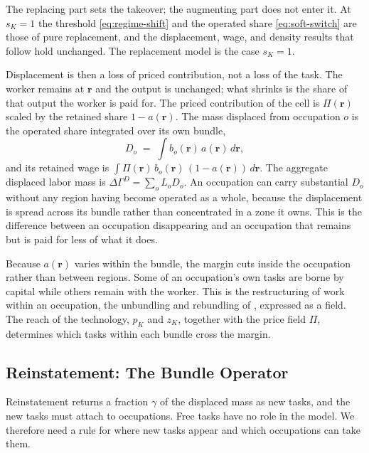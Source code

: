 \documentclass[12pt, a4paper]{article}
\begin{document}
The replacing part sets the takeover; the augmenting part does not enter
it. At $s_K = 1$ the threshold \eqref{eq:regime-shift} and the operated
share \eqref{eq:soft-switch} are those of pure replacement, and the
displacement, wage, and density results that follow hold unchanged. The
replacement model is the case $s_K = 1$.

Displacement is then a loss of priced contribution, not a loss of the
task. The worker remains at $\mathbf{r}$ and the output is unchanged;
what shrinks is the share of that output the worker is paid for. The
priced contribution of the cell is $\Pi(\mathbf{r})$ scaled by the
retained share $1 - a(\mathbf{r})$. The mass displaced from occupation
$o$ is the operated share integrated over its own bundle,
\begin{equation}
  D_o \;=\; \int b_o(\mathbf{r})\, a(\mathbf{r})\, d\mathbf{r},
  \label{eq:displaced}
\end{equation}
and its retained wage is
$\int \Pi(\mathbf{r})\, b_o(\mathbf{r})\, (1 - a(\mathbf{r}))\,
d\mathbf{r}$. The aggregate displaced labor mass is
$\Delta\Gamma^D = \sum_o L_o D_o$. An occupation can carry substantial
$D_o$ without any region having become operated as a whole, because the
displacement is spread across its bundle rather than concentrated in a
zone it owns. This is the difference between an occupation disappearing
and an occupation that remains but is paid for less of what it does.

Because $a(\mathbf{r})$ varies within the bundle, the margin cuts
inside the occupation rather than between regions. Some of an
occupation's own tasks are borne by capital while others remain with
the worker. This is the restructuring of work within an occupation, the
unbundling and rebundling of \textcite{brynjolfsson2018mlworkforce},
expressed as a field. The reach of the technology, $p_K$ and $z_K$,
together with the price field $\Pi$, determines which tasks within each
bundle cross the margin.

\subsection{Reinstatement: The Bundle Operator}
\label{sec:reinstatement}

Reinstatement returns a fraction $\gamma$ of the displaced mass as new
tasks, and the new tasks must attach to occupations. Free tasks have
no role in the model. We therefore need a rule for where new tasks
appear and which occupations can take them.
\end{document}
